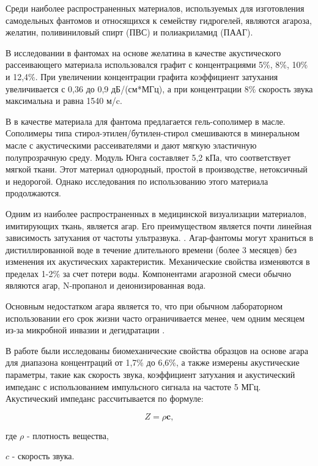 Среди наиболее распространенных материалов, используемых для изготовления самодельных фантомов и относящихся к семейству гидрогелей, являются агароза, желатин, поливиниловый спирт (ПВС) и полиакриламид (ПААГ).

В исследовании \cite{litlink46} в фантомах на основе желатина в качестве акустического рассеивающего материала использовался графит с концентрациями 5\%, 8\%, 10\% и 12,4\%. При увеличении концентрации графита коэффициент затухания увеличивается с 0,36 до 0,9 дБ/(см*МГц), а при концентрации 8\% скорость звука максимальна и равна 1540 м/c.

В \cite{litlink45} в качестве материала для фантома предлагается гель-сополимер в масле. Сополимеры типа стирол-этилен/бутилен-стирол смешиваются в минеральном масле с акустическими рассеивателями и дают мягкую эластичную полупрозрачную среду. Модуль Юнга составляет 5,2 кПа, что соответствует мягкой ткани. Этот материал однородный, простой в производстве, нетоксичный и недорогой. Однако исследования по использованию этого материала продолжаются.  

Одним из наиболее распространенных в медицинской визуализации материалов, имитирующих ткань, является агар. Его преимуществом является почти линейная зависимость затухания от частоты ультразвука. \cite{litlink46}. Агар-фантомы могут храниться в дистиллированной воде в течение длительного времени (более 3 месяцев) без изменения их акустических характеристик. Механические свойства изменяются в пределах 1-2\% за счет потери воды. Компонентами агарозной смеси обычно являются агар, N-пропанол и деионизированная вода. 

Основным недостатком агара является то, что при обычном лабораторном использовании его срок жизни часто ограничивается менее, чем одним месяцем из-за микробной инвазии и дегидратации \cite{litlink47}.

В работе \cite{litlink48} были исследованы биомеханические свойства образцов на основе агара для диапазона концентраций от 1,7\% до 6,6\%, а также измерены акустические параметры, такие как скорость звука, коэффициент затухания и акустический импеданс с использованием импульсного сигнала на частоте 5 МГц. Акустический импеданс рассчитывается по формуле:

\begin{equation}
Z=\rho \mathbf{c},
\end{equation}

где $\rho$ - плотность вещества,

$c$ - скорость звука.

